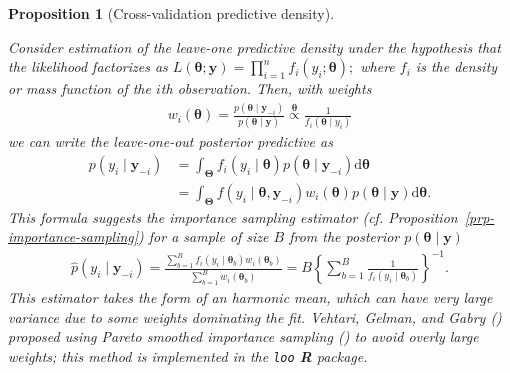 \documentclass[
  11pt,
  letterpaper,
]{scrbook}
\theoremstyle{plain}
\theoremstyle{plain}
\newtheorem{proposition}{Proposition}[chapter]
\theoremstyle{plain}
\theoremstyle{definition}
\theoremstyle{definition}
\theoremstyle{definition}
\theoremstyle{remark}
\begin{document}
\begin{proposition}[Cross-validation predictive
density]\protect\hypertarget{prp-cv-predictive-dens}{}\label{prp-cv-predictive-dens}

Consider estimation of the leave-one predictive density under the
hypothesis that the likelihood factorizes as
\(L(\boldsymbol{\theta}; \boldsymbol{y}) = \prod_{i=1}^n f_i(y_i; \boldsymbol{\theta});\)
where \(f_i\) is the density or mass function of the \(i\)th
observation. Then, with weights \begin{align*}
w_i(\boldsymbol{\theta}) = \frac{p(\boldsymbol{\theta} \mid \boldsymbol{y}_{-i})}{p(\boldsymbol{\theta} \mid \boldsymbol{y})} \stackrel{\boldsymbol{\theta}}{\propto} \frac{1}{f_i(\boldsymbol{\theta} \mid y_i)}
\end{align*} we can write the leave-one-out posterior predictive as
\begin{align*}
p(y_i \mid \boldsymbol{y}_{-i}) &= \int_{\boldsymbol{\Theta}} f_i(y_i \mid \boldsymbol{\theta}) p(\boldsymbol{\theta} \mid \boldsymbol{y}_{-i}) \mathrm{d} \boldsymbol{\theta}
\\& = \int_{\boldsymbol{\Theta}} f(y_i \mid \boldsymbol{\theta}, \boldsymbol{y}_{-i}) w_i(\boldsymbol{\theta}) p(\boldsymbol{\theta} \mid \boldsymbol{y}) \mathrm{d} \boldsymbol{\theta}.
\end{align*} This formula suggests the importance sampling estimator
(cf. Proposition~\ref{prp-importance-sampling}) for a sample of size
\(B\) from the posterior \(p(\boldsymbol{\theta} \mid \boldsymbol{y})\)
\begin{align*}
\widehat{p}(y_i \mid \boldsymbol{y}_{-i}) = \frac{\sum_{b=1}^B f_i(y_i \mid \boldsymbol{\theta}_b) w_i(\boldsymbol{\theta}_b)}{\sum_{b=1}^Bw_i(\boldsymbol{\theta}_b)}  = B \left\{\sum_{b=1}^B \frac{1}{f_i (y_i \mid \boldsymbol{\theta}_b)}\right\}^{-1}.
\end{align*} This estimator takes the form of an harmonic mean, which
can have very large variance due to some weights dominating the fit.
Vehtari, Gelman, and Gabry
() proposed using Pareto
smoothed importance sampling
() to avoid overly large weights; this method is implemented in the
\texttt{loo} \textbf{R} package.


\end{proposition}
\end{document}
